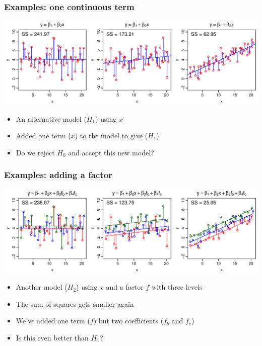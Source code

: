 \documentclass[aspectratio=43]{beamer}
\begin{document}
\begin{frame}[T]
\frametitle{Examples: one continuous term}

\includegraphics[width=\textwidth]{ANOVA_mod.pdf}

\begin{itemize}
\item An alternative model ($H_1$) using $x$
\item Added one term ($x$) to the model to give ($H_1$)
\item Do we reject $H_0$ and accept this new model?
\end{itemize}

\end{frame}


\begin{frame}[T]
\frametitle{Examples: adding a factor}

\includegraphics[width=\textwidth]{ANOVA_mod2.pdf}

\begin{itemize}
\item Another model ($H_2$) using $x$ and a factor $f$ with three levels
\item The sum of squares gets smaller again 
\item We've added one term ($f$) but two coefficients ($f_b$ and $f_c$)
\item Is this even better than $H_1$?
\end{itemize}

\end{frame}


\end{document}
